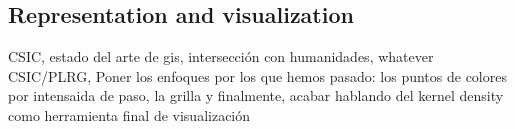 \newpage
\subsection{Representation and visualization}

 {\color{red} CSIC, estado del arte de gis, intersección con humanidades, whatever}
\\
 {\color{red} CSIC/PLRG, Poner los enfoques por los que hemos pasado: los puntos de colores por intensaida de paso, la grilla y finalmente, acabar hablando del kernel density como herramienta final de visualización} 
 

